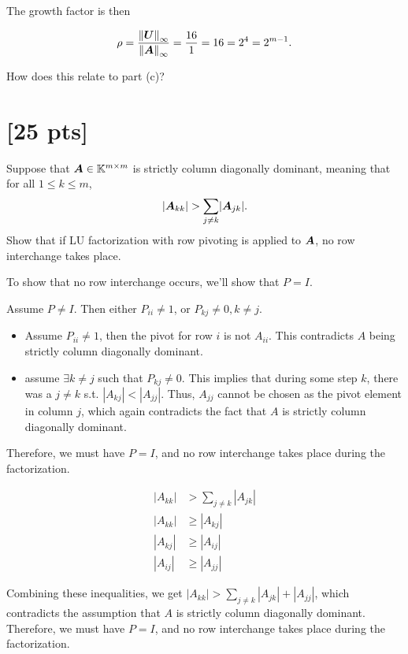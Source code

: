 \documentclass[twoside,10pt]{article}
\begin{document}
The growth factor is then

$$\rho = \dfrac{\left\| \mtx{U} \right\|_{\infty}}{\left\|\mtx{A}\right\|_{\infty}} = \dfrac{16}{1} = 16 = 2^4 = 2^{m - 1}.$$

How does this relate to part (c)? 

\section{[25 pts]}
Suppose that $\bm{A} \in \mathbb{K}^{m \times m}$ is strictly column diagonally dominant, meaning that for all $1 \leq k \leq m$, 
\begin{equation}
  \left|\mtx{A}_{kk}\right| > \sum \limits_{j \neq k} \left|\mtx{A}_{jk}\right|.
\end{equation}
Show that if LU factorization with row pivoting is applied to $\bm{A}$, no row interchange takes place.

\quad To show that no row interchange occurs, we'll show that $P=I$.

Assume $P \neq I$.
Then either $P_{ii} \neq 1$, or $P_{kj} \neq 0, k \neq j$.
\begin{itemize}
  \item Assume $P_{ii} \neq 1$, then the pivot for row $i$ is not $A_{ii}$.
  This contradicts $A$ being strictly column diagonally dominant.
  \item assume $\exists k \neq j$ such that $P_{kj} \neq 0$.
  This implies that during some step $k$, there was a $j \neq k$ s.t. $|A_{kj}| < |A_{jj}|.$
  Thus, $A_{jj}$ cannot be chosen as the pivot element in column $j$, which again contradicts the fact that $A$ is strictly column diagonally dominant.
\end{itemize}

Therefore, we must have $P=I$, and no row interchange takes place during the factorization.


\begin{align*}
    |A_{kk}| &> \sum_{j \neq k} |A_{jk}| \\
    |A_{kk}| &\geq |A_{kj}| \\
    |A_{kj}| &\geq |A_{ij}| \\
    |A_{ij}| &\geq |A_{jj}|
\end{align*}

Combining these inequalities, we get $|A_{kk}| > \sum_{j \neq k} |A_{jk}| + |A_{jj}|$, which contradicts the assumption that $A$ is strictly column diagonally dominant. Therefore, we must have $P=I$, and no row interchange takes place during the factorization.
\end{document}
